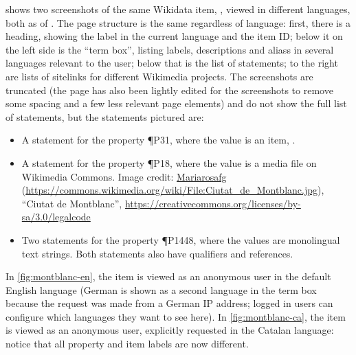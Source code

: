  shows two screenshots of the same \gls{Wikidata} \gls{item},
, viewed in different languages,
both as of .
The page structure is the same regardless of language:
first, there is a heading, showing the \gls{label} in the current language and the \gls{item ID};
below it on the left side is the “term box”,
listing \glspl{label}, \glspl{description} and \glspl{alias} in several languages relevant to the user;
below that is the list of \glspl{statement};
to the right are lists of \glspl{sitelink} for different \gls{Wikimedia} projects.
The screenshots are truncated
(the page has also been lightly edited for the screenshots
to remove some spacing and a few less relevant page elements)
and do not show the full list of \glspl{statement},
but the \glspl{statement} pictured are:
\begin{itemize}
\item A \gls{statement} for the \gls{property} \P{P31},
  where the value is an \gls{item}, .
\item A \gls{statement} for the \gls{property} \P{P18},
  where the value is a media file on \gls{Wikimedia Commons}.
  Image credit:
  \href{https://commons.wikimedia.org/wiki/User:Mariarosafg}{Mariarosafg}
  (\url{https://commons.wikimedia.org/wiki/File:Ciutat_de_Montblanc.jpg}),
  “Ciutat de Montblanc”,
  \url{https://creativecommons.org/licenses/by-sa/3.0/legalcode}
\item Two \glspl{statement} for the \gls{property} \P{P1448},
  where the values are monolingual text strings.
  Both \glspl{statement} also have \glspl{qualifier} and \glspl{reference}.
\end{itemize}
In \cref{fig:montblanc-en},
the \gls{item} is viewed as an anonymous user in the default English language
(German is shown as a second language in the term box
because the request was made from a German IP address;
logged in users can configure which languages they want to see here).
In \cref{fig:montblanc-ca},
the \gls{item} is viewed as an anonymous user, explicitly requested in the Catalan language:
notice that all \gls{property} and \gls{item} \glspl{label} are now different.

